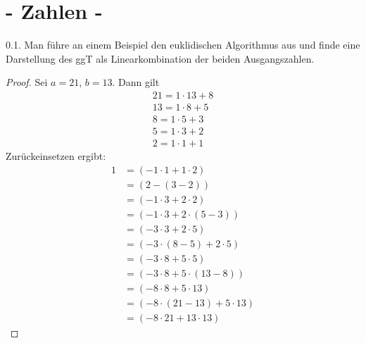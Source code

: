 \documentclass{article}
\newcommand{\ex}[1]{\tit{Übung} #1.}
\begin{document}
	\section*{\centering - Zahlen -}
		\ex{0.1} Man führe an einem Beispiel den euklidischen Algorithmus aus und finde eine Darstellung des ggT als Linearkombination der beiden Ausgangszahlen.
		\begin{proof}
			Sei $a = 21$, $b = 13$. Dann gilt
			\begin{align*}
				21 = 1 \cdot 13 + 8\\
				13 = 1 \cdot 8 + 5\\
				8 = 1 \cdot 5 + 3\\
				5 = 1 \cdot 3 + 2\\
				2 = 1 \cdot 1 + 1
			\end{align*}
			Zurückeinsetzen ergibt:
			\begin{align*}
				1 
				&= (-1 \cdot 1 + 1 \cdot 2)\\
				&= (2 - (3 - 2))\\
				&= (-1 \cdot 3 + 2 \cdot 2)\\
				&= (-1 \cdot 3 + 2 \cdot (5 - 3))\\
				&= (-3 \cdot 3 + 2 \cdot 5)\\
				&= (-3 \cdot (8 - 5) + 2 \cdot 5)\\
				&= (-3 \cdot 8 + 5 \cdot 5)\\
				&= (-3 \cdot 8 + 5 \cdot (13 - 8))\\
				&= (-8 \cdot 8 + 5 \cdot 13)\\
				&= (-8 \cdot (21 - 13) + 5 \cdot 13)\\
				&= (-8 \cdot 21 + 13 \cdot 13)
			\end{align*}
		\end{proof}
		
\end{document}

